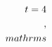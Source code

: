 \documentclass[preview]{standalone}
\begin{document}
\begin{align*}
\special{dvisvgm:raw <g id='unique000'>}t = 4\\,\\mathrm{s}\special{dvisvgm:raw </g>}
\end{align*}
\end{document}
